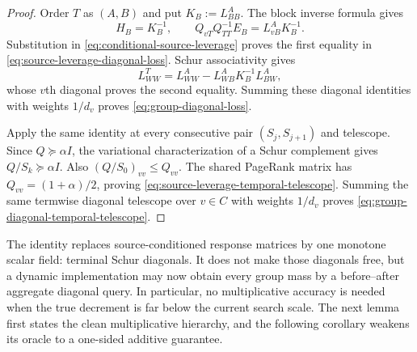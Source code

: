 \begin{proof}
Order $T$ as $(A,B)$ and put $K_B:=L^A_{BB}$.  The block inverse formula gives
\begin{equation*}
 H_B=K_B^{-1},
 \qquad
 Q_{vT}Q_{TT}^{-1}E_B=L^A_{vB}K_B^{-1}.
\end{equation*}
Substitution in \cref{eq:conditional-source-leverage} proves the first
equality in \cref{eq:source-leverage-diagonal-loss}.  Schur associativity
gives
\begin{equation*}
 L^T_{WW}
 =L^A_{WW}-L^A_{WB}K_B^{-1}L^A_{BW},
\end{equation*}
whose $v$th diagonal proves the second equality.  Summing these diagonal
identities with weights $1/d_v$ proves \cref{eq:group-diagonal-loss}.

Apply the same identity at every consecutive pair $(S_j,S_{j+1})$ and
telescope.  Since $Q\succeq\alpha I$, the variational characterization of a
Schur complement gives $Q/S_k\succeq\alpha I$.  Also
$(Q/S_0)_{vv}\leq Q_{vv}$.  The shared PageRank matrix has
$Q_{vv}=(1+\alpha)/2$, proving
\cref{eq:source-leverage-temporal-telescope}.  Summing the same termwise
diagonal telescope over $v\in C$ with weights $1/d_v$ proves
\cref{eq:group-diagonal-temporal-telescope}.
\end{proof}

The identity replaces source-conditioned response matrices by one monotone
scalar field: terminal Schur diagonals.  It does not make those diagonals
free, but a dynamic implementation may now obtain every group mass by a
before--after aggregate diagonal query.  In particular, no multiplicative
accuracy is needed when the true decrement is far below the current search
scale.  The next lemma first states the clean multiplicative hierarchy, and
the following corollary weakens its oracle to a one-sided additive guarantee.

